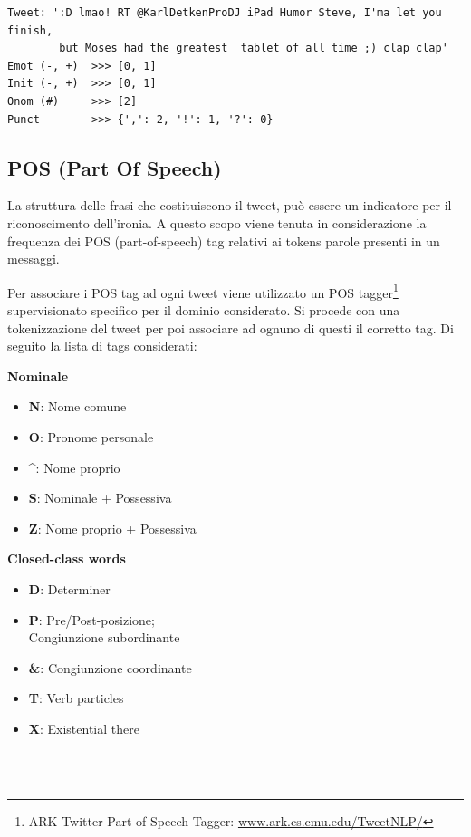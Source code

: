 \documentclass[oneside]{book}
\begin{document}
\begin{lstlisting}[caption={Esempio di tweet processato per estrarre le particelle pragmatiche.}]
Tweet: ':D lmao! RT @KarlDetkenProDJ iPad Humor Steve, I'ma let you finish,
        but Moses had the greatest  tablet of all time ;) clap clap'
Emot (-, +)  >>> [0, 1]
Init (-, +)  >>> [0, 1]
Onom (#)     >>> [2]
Punct        >>> {',': 2, '!': 1, '?': 0}
\end{lstlisting}


\subsection{POS (Part Of Speech)}
La struttura delle frasi che costituiscono il tweet, può essere un indicatore per il riconoscimento dell'ironia. A questo scopo viene tenuta in considerazione la frequenza dei POS (part-of-speech) tag relativi ai tokens parole presenti in un messaggi.

Per associare i POS tag ad ogni tweet viene utilizzato un POS tagger\footnote{ARK Twitter Part-of-Speech Tagger: \url{www.ark.cs.cmu.edu/TweetNLP/}} supervisionato specifico per il dominio considerato. Si procede con una tokenizzazione del tweet per poi associare ad ognuno di questi il corretto tag. Di seguito la lista di tags considerati:\\


\begin{varwidth}[t]{\textwidth}
	\textbf{Nominale}
	\begin{itemize}
		\item \textbf{N}: Nome comune
		\item \textbf{O}: Pronome personale
		\item \textbf{\^}: Nome proprio
		\item \textbf{S}: Nominale + Possessiva
		\item \textbf{Z}: Nome proprio + Possessiva
	\end{itemize}
\end{varwidth}
\hspace{4em}
\begin{varwidth}[t]{\textwidth}
	\textbf{Closed-class words}
	\begin{itemize}
		\item \textbf{D}: Determiner
		\item \textbf{P}: Pre/Post-posizione;\\Congiunzione subordinante
		\item \textbf{\&}: Congiunzione coordinante
		\item \textbf{T}: Verb particles
		\item \textbf{X}: Existential there
	\end{itemize}
\end{varwidth}\\\\
\end{document}
